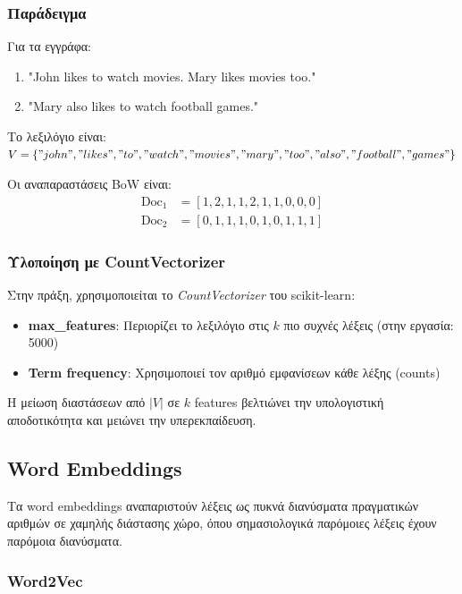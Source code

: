 \documentclass[12pt,a4paper,twoside]{book}
\begin{document}
\subsubsection{Παράδειγμα}

Για τα εγγράφα:
\begin{enumerate}
    \item "John likes to watch movies. Mary likes movies too."
    \item "Mary also likes to watch football games."
\end{enumerate}

Το λεξιλόγιο είναι: \(V = \{"john", "likes", "to", "watch", "movies", "mary", "too", "also", "football", "games"\}\)

Οι αναπαραστάσεις BoW είναι:
\begin{align}
    \text{Doc}_1 & = [1, 2, 1, 1, 2, 1, 1, 0, 0, 0] \\
    \text{Doc}_2 & = [0, 1, 1, 1, 0, 1, 0, 1, 1, 1]
\end{align}

\subsubsection{Υλοποίηση με CountVectorizer}

Στην πράξη, χρησιμοποιείται το \textit{CountVectorizer} του scikit-learn:
\begin{itemize}
    \item \textbf{max\_features}: Περιορίζει το λεξιλόγιο στις \(k\) πιο συχνές λέξεις (στην εργασία: 5000)
    \item \textbf{Term frequency}: Χρησιμοποιεί τον αριθμό εμφανίσεων κάθε λέξης (counts)
\end{itemize}

Η μείωση διαστάσεων από \(|V|\) σε \(k\) features βελτιώνει την υπολογιστική αποδοτικότητα και μειώνει την υπερεκπαίδευση.

\subsection{Word Embeddings}

Τα word embeddings αναπαριστούν λέξεις ως πυκνά διανύσματα πραγματικών αριθμών σε χαμηλής διάστασης χώρο, όπου σημασιολογικά παρόμοιες λέξεις έχουν παρόμοια διανύσματα.

\subsubsection{Word2Vec}
\end{document}
